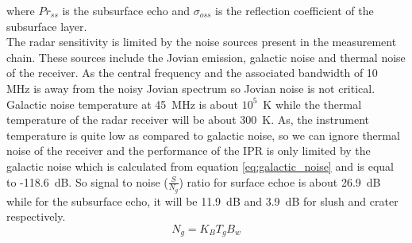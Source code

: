 where $Pr_{ss}$ is the subsurface echo and $\sigma_{oss}$ is the reflection coefficient of the subsurface layer.\\
The radar sensitivity is limited by the noise sources present in the measurement chain. These sources include the Jovian emission, galactic noise and thermal noise of the receiver.  As the central frequency and the associated bandwidth of 10~ MHz is away from the noisy Jovian spectrum so Jovian noise is not critical. Galactic noise temperature at 45~MHz is about $10^{5}$~K while the thermal temperature of the radar receiver will be about  300~K. As, the instrument temperature is quite low as compared to galactic noise, so we can ignore thermal noise of the receiver and the performance of the \ac{IPR} is only limited by the galactic noise which is calculated from equation \ref{eq:galactic_noise} and is equal to -118.6~dB. So signal to noise ($\frac{S}{N_{g}}$) ratio for surface echoe is about 26.9~dB while for the subsurface echo, it will be 11.9~dB and 3.9~dB for slush and crater respectively.
\begin{equation}
N_{g} = K_{B}T_{g}B_{w}
\label{eq:galactic_noise}
\end{equation}
\\


